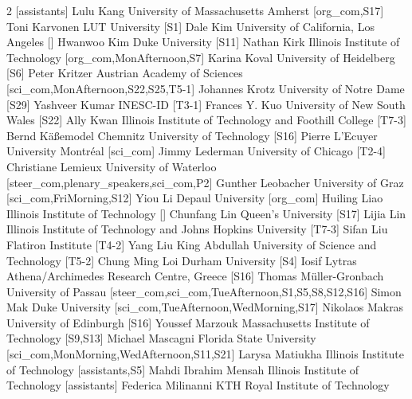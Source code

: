 \documentclass[12pt,lettersize,oneside]{book} %
\begin{document}
\begin{multicols}{2}
  [assistants]
\participantne
  {Lulu Kang}
  {University of Massachusetts Amherst}
  [org_com,S17]
\participantne
  {Toni Karvonen}
  {LUT University}
  [S1]
\participantne
  {Dale Kim}
  {University of California, Los Angeles}
  []
\participantne
  {Hwanwoo Kim}
  {Duke University}
  [S11]
\participantne
  {Nathan Kirk}
  {Illinois Institute of Technology}
  [org_com,MonAfternoon,S7]
\participantne
  {Karina Koval}
  {University of Heidelberg}
  [S6]
\participantne
  {Peter Kritzer}
  {Austrian Academy of Sciences}
  [sci_com,MonAfternoon,S22,S25,T5-1]
\participantne
  {Johannes Krotz}
  {University of Notre Dame}
  [S29]
\participantne
  {Yashveer Kumar}
  {INESC-ID}
  [T3-1]
\participantne
  {Frances Y. Kuo}
  {University of New South Wales}
  [S22]
\participantne
  {Ally Kwan}
  {Illinois Institute of Technology and Foothill College}
  [T7-3]
\participantne
  {Bernd K\"a{\ss}emodel}
  {Chemnitz University of Technology}
  [S16]
\participantne
  {Pierre L'Ecuyer}
  {University Montr\'eal}
  [sci_com]
\participantne
  {Jimmy Lederman}
  {University of Chicago}
  [T2-4]
\participantne
  {Christiane Lemieux}
  {University of Waterloo}
  [steer_com,plenary_speakers,sci_com,P2]
\participantne
  {Gunther Leobacher}
  {University of Graz}
  [sci_com,FriMorning,S12]
\participantne
  {Yiou Li}
  {Depaul University}
  [org_com]
\participantne
  {Huiling Liao}
  {Illinois Institute of Technology}
  []
\participantne
  {Chunfang Lin}
  {Queen's University}
  [S17]
\participantne
  {Lijia Lin}
  {Illinois Institute of Technology and Johns Hopkins University}
  [T7-3]
\participantne
  {Sifan Liu}
  {Flatiron Institute}
  [T4-2]
\participantne
  {Yang Liu}
  {King Abdullah University of Science and Technology}
  [T5-2]
\participantne
  {Chung Ming Loi}
  {Durham University}
  [S4]
\participantne
  {Iosif Lytras}
  {Athena/Archimedes Research Centre, Greece}
  [S16]
\participantne
  {Thomas M\"uller-Gronbach}
  {University of Passau}
  [steer_com,sci_com,TueAfternoon,S1,S5,S8,S12,S16]
\participantne
  {Simon Mak}
  {Duke University}
  [sci_com,TueAfternoon,WedMorning,S17]
\participantne
  {Nikolaos Makras}
  {University of Edinburgh}
  [S16]
\participantne
  {Youssef Marzouk}
  {Massachusetts Institute of Technology}
  [S9,S13]
\participantne
  {Michael Mascagni}
  {Florida State University}
  [sci_com,MonMorning,WedAfternoon,S11,S21]
\participantne
  {Larysa Matiukha}
  {Illinois Institute of Technology}
  [assistants,S5]
\participantne
  {Mahdi Ibrahim Mensah}
  {Illinois Institute of Technology}
  [assistants]
\participantne
  {Federica Milinanni}
  {KTH Royal Institute of Technology}

\end{multicols}
\end{document}
